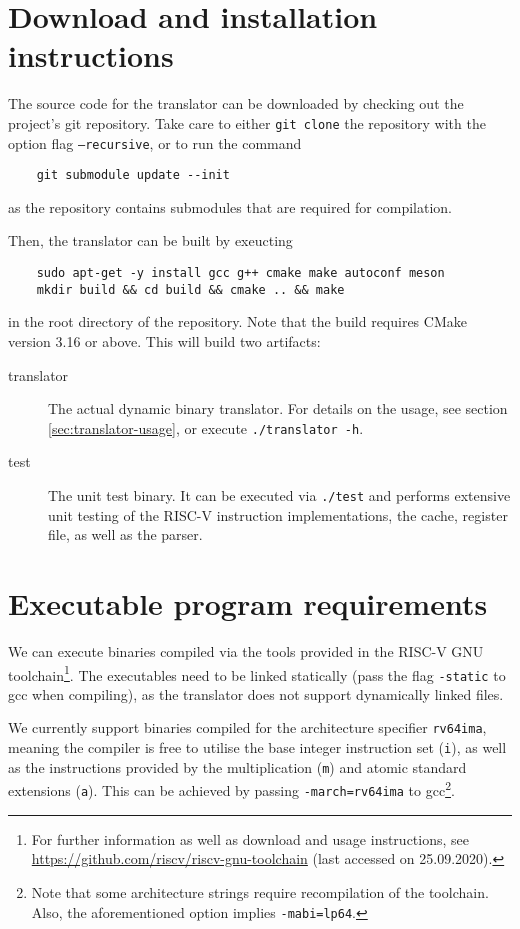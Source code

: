 \section{Download and installation instructions}
The source code for the translator can be downloaded by checking out the project's git repository.
Take care to either \texttt{git clone} the repository with the option flag \texttt{--recursive}, or to run the command
\begin{lstlisting}
	git submodule update --init
\end{lstlisting}
as the repository contains submodules that are required for compilation.

Then, the translator can be built by exeucting
\begin{lstlisting}
	sudo apt-get -y install gcc g++ cmake make autoconf meson
	mkdir build && cd build && cmake .. && make
\end{lstlisting}
in the root directory of the repository.
Note that the build requires CMake version 3.16 or above.
This will build two artifacts:
\begin{description}
	\item[translator] The actual dynamic binary translator.
	For details on the usage, see section \vref{sec:translator-usage}, or execute \texttt{./translator -h}.
	
	\item[test] The unit test binary.
	It can be executed via \texttt{./test} and performs extensive unit testing of the RISC-V instruction implementations, the cache, register file, as well as the parser.
\end{description}

\section{Executable program requirements}
We can execute binaries compiled via the tools provided in the RISC-V GNU toolchain\footnote{For further information as well as download and usage instructions, see \url{https://github.com/riscv/riscv-gnu-toolchain} (last accessed on 25.09.2020).}.
The executables need to be linked statically (pass the flag \texttt{-static} to gcc when compiling), as the translator does not support dynamically linked files.

We currently support binaries compiled for the architecture specifier \texttt{rv64ima}, meaning the compiler is free to utilise the base integer instruction set (\texttt{i}), as well as the instructions provided by the multiplication (\texttt{m}) and atomic standard extensions (\texttt{a}).
This can be achieved by passing \texttt{-march=rv64ima} to gcc\footnote{Note that some architecture strings require recompilation of the toolchain. Also, the aforementioned option implies \texttt{-mabi=lp64}.}.


